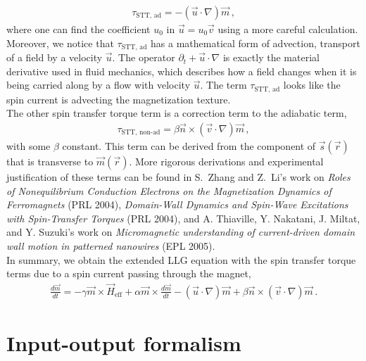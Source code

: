 \documentclass[11pt, onesided]{book}
\theoremstyle{break}
\theoremstyle{break}
\newcommand{\pd}{\partial}
\begin{document}
\begin{align*}
\tau_{\text{STT,\ ad}} = -(\vec{u}\cdot \nabla) \vec{m}\,,
\end{align*}
where one can find the coefficient $u_0$ in $\vec{u} = u_0 \vec{v}$ using a more careful calculation. Moreover, we notice that $\tau_{\text{STT,\ ad}}$ has a mathematical form of advection, transport of a field by a velocity $\vec{u}$. The operator $\pd_t + \vec{u}\cdot \nabla$ is exactly the material derivative used in fluid mechanics, which describes how a field changes when it is being carried along by a flow with velocity $\vec{u}$. The term $\tau_{\text{STT,\ ad}}$ looks like the spin current is advecting the magnetization texture.\\

The other spin transfer torque term is a correction term to the adiabatic term, 
\begin{align*}
\tau_{\text{STT,\ non-ad}} = \beta \vec{n}\times (\vec{v}\cdot \nabla) \vec{m}\,,
\end{align*}
with some $\beta$ constant. This term can be derived from the component of $\vec{s}(\vec{r})$ that is transverse to $\vec{m}(\vec{r})$. More rigorous derivations and experimental justification of these terms can be found in S.\ Zhang and Z.\ Li's work on \textit{Roles of Nonequilibrium Conduction Electrons on the Magnetization Dynamics of Ferromagnets} (PRL 2004), \textit{Domain-Wall Dynamics and Spin-Wave Excitations with Spin-Transfer Torques} (PRL 2004), and A. Thiaville, Y. Nakatani, J. Miltat, and Y. Suzuki's work on \textit{Micromagnetic understanding of current-driven domain wall motion in patterned nanowires} (EPL 2005). \\

In summary, we obtain the extended LLG equation with the spin transfer torque terms due to a spin current passing through the magnet, 
\begin{align*}
\frac{d\vec{m}}{dt} = -\gamma \vec{m}\times \vec{H}_{\text{eff}} + \alpha \vec{m}\times \frac{d\vec{m}}{dt}-(\vec{u}\cdot \nabla) \vec{m} +\beta \vec{n}\times (\vec{v}\cdot \nabla) \vec{m}\,.
\end{align*}

\section{Input-output formalism}
\end{document}
